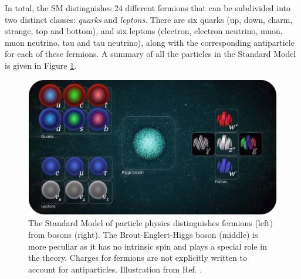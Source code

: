 In total, the SM distinguishes 24 different fermions that can be subdivided into two distinct classes: \textit{quarks} and \textit{leptons}. There are six quarks (up, down, charm, strange, top and bottom), and six leptons (electron, electron neutrino, muon, muon neutrino, tau and tau neutrino), along with the corresponding antiparticle for each of these fermions.
A summary of all the particles in the Standard Model is given in Figure \ref{SMparticles}.

\begin{figure}[t]
\centering
\includegraphics[width = \textwidth]{chapter1/img/SMparticles_rounded}
\caption{The Standard Model of particle physics distinguishes fermions (left) from bosons (right). The Brout-Englert-Higgs boson (middle) is more peculiar as it has no intrinsic spin and plays a special role in the theory. Charges for fermions are not explicitly written to account for antiparticles. Illustration from Ref. \cite{cernSMpic}.}
\label{SMparticles}
\end{figure}

